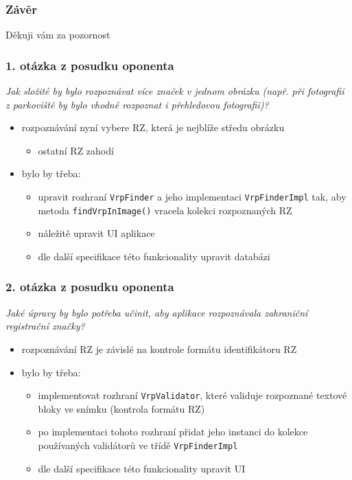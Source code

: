 \documentclass{beamer}
\begin{document}
\begin{frame}
\frametitle{Závěr}
    \fontsize{14pt}{12pt}\selectfont
    \centering
    Děkuji vám za pozornost
\end{frame}


\begin{frame}
\frametitle{1. otázka z posudku oponenta}
    \begingroup
    \fontsize{11pt}{12pt}\selectfont
    \textit{Jak složité by bylo rozpoznávat více značek v jednom obrázku (např. při fotografii z parkoviště by bylo
vhodné rozpoznat i přehledovou fotografii)?}
    \endgroup
    \bigskip
    \begin{itemize}
        \item rozpoznávání nyní vybere RZ, která je nejblíže středu obrázku
            \begin{itemize}
                \item ostatní RZ zahodí
            \end{itemize}
        \item bylo by třeba:
        \begin{itemize}
            \item upravit rozhraní \texttt{VrpFinder} a jeho implementaci \texttt{VrpFinderImpl} tak, aby metoda \texttt{findVrpInImage()} vracela kolekci rozpoznaných RZ
            
            \item náležitě upravit UI aplikace

            \item dle další specifikace této funkcionality upravit databázi
        \end{itemize}
    \end{itemize}
\end{frame}

\begin{frame}

\frametitle{2. otázka z posudku oponenta}
    \begingroup
    \fontsize{11pt}{12pt}\selectfont
    \textit{Jaké úpravy by bylo potřeba učinit, aby aplikace rozpoznávala zahraniční registrační značky?}
    \endgroup
    \bigskip
    \begin{itemize}
        \item rozpoznávání RZ je závislé na kontrole formátu identifikátoru RZ 
        \item bylo by třeba:
        \begin{itemize}
            \item implementovat rozhraní \texttt{VrpValidator}, které validuje rozpoznané textové bloky ve snímku (kontrola formátu RZ) 
            \item po implementaci tohoto rozhraní přidat jeho instanci do kolekce používaných validátorů ve třídě \texttt{VrpFinderImpl}

            \item dle další specifikace této funkcionality upravit UI
        \end{itemize}
    \end{itemize}
\end{frame}
\end{document}
